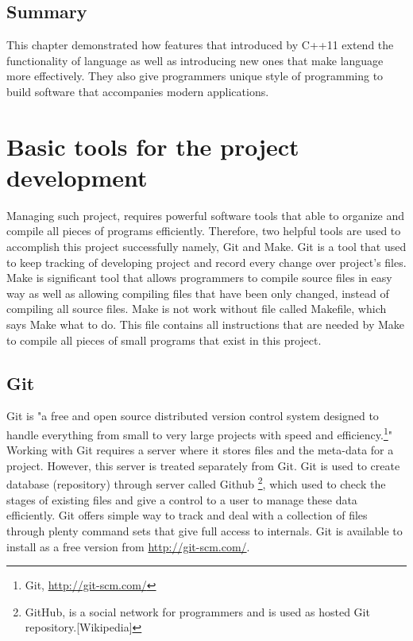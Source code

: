 \documentclass[11pt]{report}
\begin{document}
\section{Summary}
\label{section1: Summary}
This chapter demonstrated how features that introduced by C++11 extend the functionality of language as well as introducing new ones that make language more effectively. They also give programmers unique style of programming to build software that accompanies modern applications.

\chapter{Basic tools for the project development}
\label{cha: tools}
Managing such project, requires powerful software tools that able to organize and compile all pieces of programs efficiently. Therefore, two helpful tools are used to accomplish this project successfully namely, Git and Make. Git is a tool that used to keep tracking of developing project and record every change over project's files. Make is significant tool that allows programmers to compile source files in easy way as well as allowing compiling files that have been only changed, instead of compiling all source files. Make is not work without file called Makefile, which says Make what to do. This file contains all instructions that are needed by Make to compile all pieces of small programs that exist in this project.

\section{Git}
\label{sec: Git}
Git is "a free and open source distributed version control system designed to handle everything from small to very large projects with speed and efficiency.\footnote{Git, \url{http://git-scm.com/}}"  Working with Git requires a server where it stores files and the meta-data for a project. However, this server is treated separately from Git.  Git is used to create database (repository) through server called Github \footnote{GitHub, is a social network for programmers and is used as hosted Git repository.[Wikipedia]}, which used to check the stages of existing files and give a control to a user to manage these data efficiently. Git offers simple way to track and deal with a collection of files through plenty command sets that give full access to internals. Git is available to install as a free version from  \url{http://git-scm.com/}.
\end{document}
